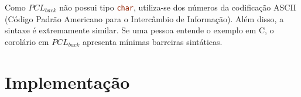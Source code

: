 Como $PCL_{back}$ não possui tipo \lstinline[language=C]|char|, utiliza-se dos números da codificação ASCII (Código Padrão Americano para o Intercâmbio de Informação). Além disso, a sintaxe é extremamente similar. Se uma pessoa entende o exemplo em C, o corolário em $PCL_{back}$ apresenta mínimas barreiras sintáticas.

\section{Implementação}

